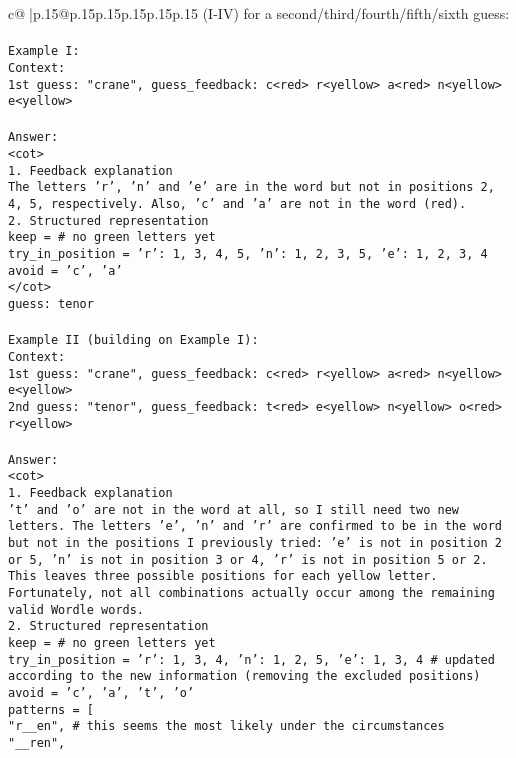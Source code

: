 \documentclass{article}
\begin{document}
{\begin{supertabular}{c@{$\;$}|p{.15\linewidth}@{}p{.15\linewidth}p{.15\linewidth}p{.15\linewidth}p{.15\linewidth}p{.15\linewidth}}
{{{(I-IV) for a second/third/fourth/fifth/sixth guess:\\ \tt \\ \tt Example I:\\ \tt Context:\\ \tt 1st guess: "crane", guess_feedback: c<red> r<yellow> a<red> n<yellow> e<yellow>\\ \tt \\ \tt Answer:\\ \tt <cot>\\ \tt 1. Feedback explanation\\ \tt The letters 'r', 'n' and 'e' are in the word but not in positions 2, 4, 5, respectively. Also, 'c' and 'a' are not in the word (red).\\ \tt 2. Structured representation\\ \tt keep = {}  # no green letters yet\\ \tt try_in_position = {'r': {1, 3, 4, 5}, 'n': {1, 2, 3, 5}, 'e': {1, 2, 3, 4}}\\ \tt avoid = {'c', 'a'}\\ \tt </cot>\\ \tt guess: tenor\\ \tt \\ \tt Example II (building on Example I):\\ \tt Context:\\ \tt 1st guess: "crane", guess_feedback: c<red> r<yellow> a<red> n<yellow> e<yellow>\\ \tt 2nd guess: "tenor", guess_feedback: t<red> e<yellow> n<yellow> o<red> r<yellow>\\ \tt \\ \tt Answer:\\ \tt <cot>\\ \tt 1. Feedback explanation\\ \tt 't' and 'o' are not in the word at all, so I still need two new letters. The letters 'e', 'n' and 'r' are confirmed to be in the word but not in the positions I previously tried: 'e' is not in position 2 or 5, 'n' is not in position 3 or 4, 'r' is not in position 5 or 2. This leaves three possible positions for each yellow letter. Fortunately, not all combinations actually occur among the remaining valid Wordle words.\\ \tt 2. Structured representation\\ \tt keep = {}  # no green letters yet\\ \tt try_in_position = {'r': {1, 3, 4}, 'n': {1, 2, 5}, 'e': {1, 3, 4}}  # updated according to the new information (removing the excluded positions)\\ \tt avoid = {'c', 'a', 't', 'o'}\\ \tt patterns = [\\ \tt     "r__en",  # this seems the most likely under the circumstances\\ \tt     "__ren",\\ \tt   }}}
\end{supertabular}}
\end{document}
